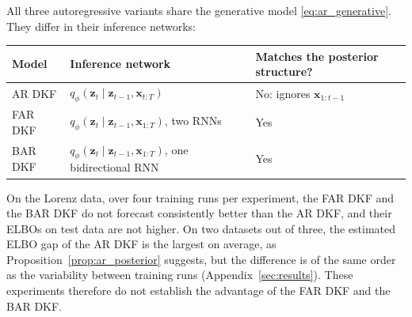 All three autoregressive variants share the generative model
\eqref{eq:ar_generative}. They differ in their inference networks:
\begin{center}
\begin{tabular}{|l|l|l|}
\hline
\textbf{Model} & \textbf{Inference network} & \textbf{Matches the
posterior structure?} \\ \hline
AR DKF & $q_\phi(\mathbf{z}_t \mid \mathbf{z}_{t-1}, \mathbf{x}_{t:T})$
& No: ignores $\mathbf{x}_{1:t-1}$ \\ \hline
FAR DKF & $q_\phi(\mathbf{z}_t \mid \mathbf{z}_{t-1}, \mathbf{x}_{1:T})$,
two RNNs & Yes \\ \hline
BAR DKF & $q_\phi(\mathbf{z}_t \mid \mathbf{z}_{t-1}, \mathbf{x}_{1:T})$,
one bidirectional RNN & Yes \\ \hline
\end{tabular}
\end{center}
On the Lorenz data, over four training runs per experiment, the FAR DKF
and the BAR DKF do not forecast consistently better than the AR DKF, and
their ELBOs on test data are not higher. On two datasets
out of three, the estimated ELBO gap of the AR DKF is the largest on
average, as Proposition~\ref{prop:ar_posterior} suggests, but the
difference is of the same order as the variability between training runs
(Appendix~\ref{sec:results}). These experiments therefore do not
establish the advantage of the FAR DKF and the BAR DKF.
